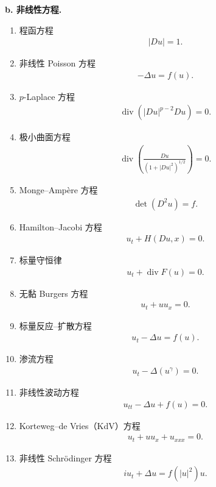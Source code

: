 \documentclass[../../main.tex]{subfiles}
\begin{document}
\textbf{b. 非线性方程.}
\begin{enumerate}
\item 程函方程
\begin{align*}
|Du|=1.
\end{align*}
\item 非线性 Poisson 方程
\begin{align*}
-\Delta u=f(u).
\end{align*}
\item $p$-Laplace 方程
\begin{align*}
\operatorname{div}(|Du|^{p-2}Du)=0.
\end{align*}
\item 极小曲面方程
\begin{align*}
\operatorname{div}\!\left(\frac{Du}{(1+|Du|^2)^{1/2}}\right)=0.
\end{align*}
\item Monge--Amp\`ere 方程
\begin{align*}
\det(D^2 u)=f.
\end{align*}
\item Hamilton--Jacobi 方程
\begin{align*}
u_t+H(Du,x)=0.
\end{align*}
\item 标量守恒律
\begin{align*}
u_t+\operatorname{div}F(u)=0.
\end{align*}
\item 无黏 Burgers 方程
\begin{align*}
u_t+u u_x=0.
\end{align*}
\item 标量反应--扩散方程
\begin{align*}
u_t-\Delta u=f(u).
\end{align*}
\item 渗流方程
\begin{align*}
u_t-\Delta(u^\gamma)=0.
\end{align*}
\item 非线性波动方程
\begin{align*}
u_{tt}-\Delta u+f(u)=0.
\end{align*}
\item Korteweg--de Vries（KdV）方程
\begin{align*}
u_t+u u_x+u_{xxx}=0.
\end{align*}
\item 非线性 Schrödinger 方程
\begin{align*}
i u_t+\Delta u=f(|u|^2)u.
\end{align*}
\end{enumerate}
\end{document}
